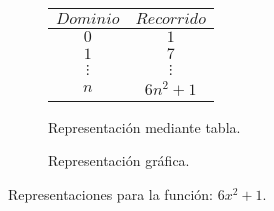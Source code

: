 \begin{figure}[h]
\centering
\begin{subfigure}[A]{0.3\textwidth}
\centering
\begin{tabular}{c|c}
$Dominio$ & $Recorrido$ \\ \hline
\hline
$0$ & $1$ \\ \hline
$1$ & $7$ \\ \hline
$\vdots$ & $\vdots$ \\ \hline
$n$& $6n^2 +1$ \\ \hline
\end{tabular} 
\caption{Representación mediante tabla.}

\end{subfigure}%
\quad
\begin{subfigure}[B]{0.3\textwidth}
\centering



\caption{Representación gráfica.}

\end{subfigure}

\caption{Representaciones para la función: $6x^2 +1$.}

\end{figure}

